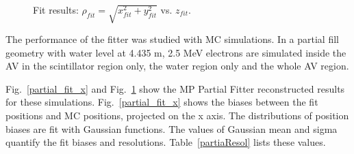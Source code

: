 \begin{figure}[htbp]
{\begin{minipage}[t]{0.38\textwidth}
		\end{minipage}
	}
	\caption{Fit results: $\rho_{fit}=\sqrt{x_{fit}^2+y_{fit}^2}$ vs. $z_{fit}$.}
	\label{partial_fit_rz}
\end{figure}

The performance of the fitter was studied with MC simulations. In a partial fill geometry with water level at 4.435 m, 2.5 MeV electrons are simulated inside the AV in the scintillator region only, the water region only and the whole AV region.

Fig.~\ref{partial_fit_x} and Fig.~\ref{partial_fit_rz} show the MP Partial Fitter reconstructed results for these simulations. Fig.~\ref{partial_fit_x} shows the biases between the fit positions and MC positions, projected on the x axis. The distributions of position biases are fit with Gaussian functions. The values of Gaussian mean and sigma quantify the fit biases and resolutions. Table~\ref{partiaResol} lists these values.

